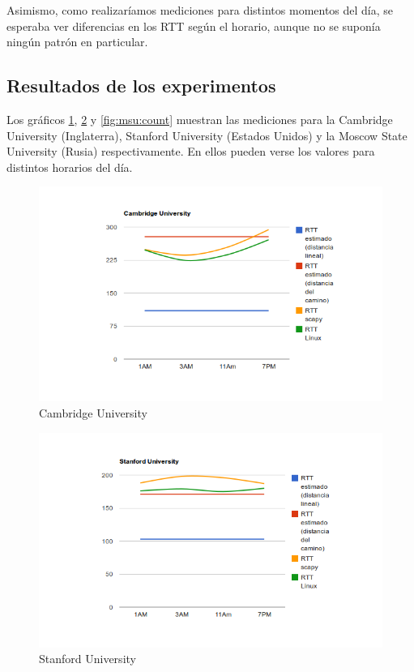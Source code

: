 Asimismo, como realizaríamos mediciones para distintos momentos del día, se
esperaba ver diferencias en los RTT según el horario, aunque no se suponía
ningún patrón en particular.

\subsection{Resultados de los experimentos}

Los gráficos \ref{fig:cambridge:count}, \ref{fig:stanford:count} y
\ref{fig:msu:count} muestran las mediciones para la Cambridge University
(Inglaterra), Stanford University (Estados Unidos) y la Moscow State
University (Rusia) respectivamente. En ellos pueden verse los valores para
distintos horarios del día.

\begin{figure}[h!]
    \centering
    \includegraphics[width=400pt]{cambridge.png}
    \caption{Cambridge University}
    \label{fig:cambridge:count}
\end{figure}

\begin{figure}[h!]
    \centering
    \includegraphics[width=400pt]{stanford.png}
    \caption{Stanford University}
    \label{fig:stanford:count}
\end{figure}

